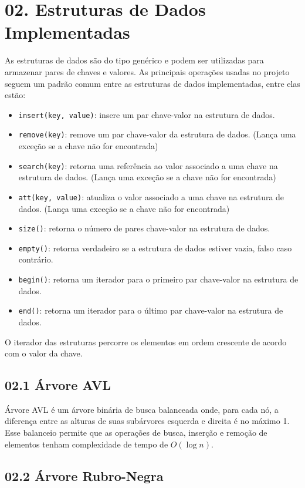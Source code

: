 \documentclass{article}
\begin{document}
\section*{02. Estruturas de Dados Implementadas}
As estruturas de dados são do tipo genérico e podem ser utilizadas para armazenar pares de chaves e valores.
As principais operações usadas no projeto seguem um padrão comum entre as estruturas de dados implementadas, entre elas estão:
\begin{itemize}
    \item \texttt{insert(key, value)}: insere um par chave-valor na estrutura de dados.
    \item \texttt{remove(key)}: remove um par chave-valor da estrutura de dados.  (Lança uma exceção se a chave não for encontrada)
    \item \texttt{search(key)}: retorna uma referência ao valor associado a uma chave na estrutura de dados. (Lança uma exceção se a chave não for encontrada)
    \item \texttt{att(key, value)}: atualiza o valor associado a uma chave na estrutura de dados. (Lança uma exceção se a chave não for encontrada)
    \item \texttt{size()}: retorna o número de pares chave-valor na estrutura de dados.	
    \item \texttt{empty()}: retorna verdadeiro se a estrutura de dados estiver vazia, falso caso contrário.
    \item \texttt{begin()}: retorna um iterador para o primeiro par chave-valor na estrutura de dados.
    \item \texttt{end()}: retorna um iterador para o último par chave-valor na estrutura de dados. \end{itemize}
O iterador das estruturas percorre os elementos em ordem crescente de acordo com o valor da chave.
\subsection*{02.1 Árvore AVL}

Árvore AVL é um árvore binária de busca balanceada onde, para cada nó, a diferença entre as alturas de suas subárvores esquerda e direita é no máximo 1. Esse balanceio permite que as operações de busca, inserção e remoção de elementos tenham complexidade de tempo de \(\displaystyle O(\log n)\).


\subsection*{02.2 Árvore Rubro-Negra}
\end{document}
